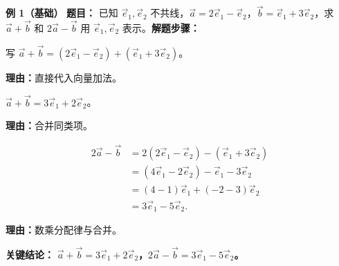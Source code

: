 \begin{examplebox}
	\textbf{\textcolor{CExample}{例 1（基础）}}
	\textbf{\textcolor{CExample}{题目：}} 已知 $\vec{e}_1,\vec{e}_2$ 不共线，$\vec{a}=2\vec{e}_1-\vec{e}_2$，$\vec{b}=\vec{e}_1+3\vec{e}_2$，求 $\vec{a}+\vec{b}$ 和 $2\vec{a}-\vec{b}$ 用 $\vec{e}_1,\vec{e}_2$ 表示。\textbf{\textcolor{CExample}{解题步骤：}}
	\begin{description}[style=nextline, leftmargin=2.8em, labelsep=0.5em, itemsep=0.45em]
		\item[\textbf{第一步（代入加法式）：}]
			写 $\vec{a}+\vec{b} = (2\vec{e}_1-\vec{e}_2) + (\vec{e}_1+3\vec{e}_2)$。
			\par\textbf{理由：}直接代入向量加法。
		\item[\textbf{第二步（合并加法式）：}]
			$\vec{a}+\vec{b} = 3\vec{e}_1+2\vec{e}_2$。
			\par\textbf{理由：}合并同类项。
		\item[\textbf{第三步（差倍运算）：}]
			\[
				\begin{aligned}
					2\vec{a}-\vec{b}&= 2(2\vec{e}_1-\vec{e}_2) - (\vec{e}_1+3\vec{e}_2) \\&= (4\vec{e}_1-2\vec{e}_2) - \vec{e}_1 - 3\vec{e}_2 \\&= (4-1)\vec{e}_1 + (-2-3)\vec{e}_2 \\&= 3\vec{e}_1 - 5\vec{e}_2.
			\end{aligned}
			\]
			\par\textbf{理由：}数乘分配律与合并。
	\end{description}
	\textbf{\textcolor{CExample}{关键结论：}}
	\textbf{$\vec{a}+\vec{b}=3\vec{e}_1+2\vec{e}_2$，$2\vec{a}-\vec{b}=3\vec{e}_1-5\vec{e}_2$。}


\end{examplebox}
